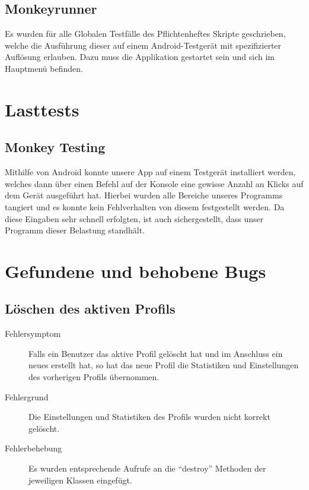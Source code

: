 \documentclass[parskip=full]{scrreprt}
\begin{document}
\section{Monkeyrunner}

Es wurden für alle Globalen Testfälle des Pflichtenheftes Skripte geschrieben, welche die Ausführung dieser auf einem Android-Testgerät mit spezifizierter Auflösung erlauben. Dazu muss die Applikation gestartet sein und sich im Hauptmenü befinden.

\chapter{Lasttests}

\section{Monkey Testing}

Mithilfe von Android konnte unsere App auf einem Testgerät installiert werden, welches dann über einen Befehl auf der Konsole eine gewisse Anzahl an Klicks auf dem Gerät ausgeführt hat. Hierbei wurden alle Bereiche unseres Programms tangiert und es konnte kein Fehlverhalten von diesem festgestellt werden. Da diese Eingaben sehr schnell erfolgten, ist auch sichergestellt, dass unser Programm dieser Belastung standhält.

\chapter{Gefundene und behobene Bugs}

\section{Löschen des aktiven Profils}
\begin{description}
	\item[Fehlersymptom] Falls ein Benutzer das aktive Profil gelöscht hat und im Anschluss ein neues erstellt hat, so hat das neue Profil die Statistiken und Einstellungen des vorherigen Profils übernommen.
	\item[Fehlergrund] Die Einstellungen und Statistiken des Profils wurden nicht korrekt gelöscht.
	\item[Fehlerbehebung] Es wurden entsprechende Aufrufe an die \enquote{destroy} Methoden der jeweiligen Klassen eingefügt.
\end{description}
\end{document}
